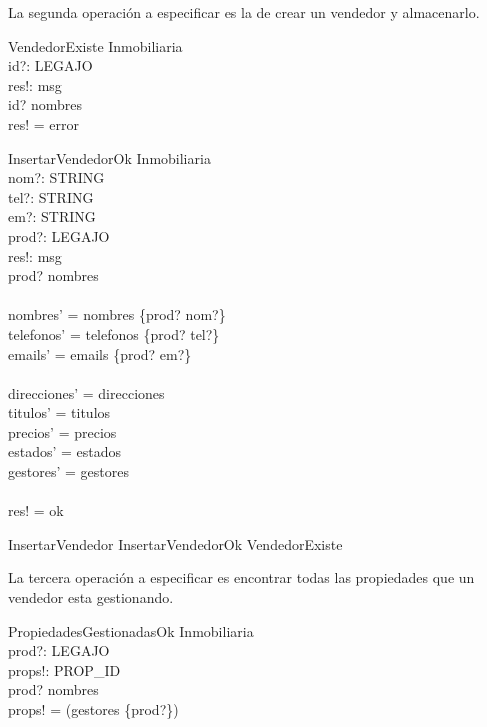 \documentclass[12pt]{article}
\begin{document}
La segunda operación a especificar es la de crear un vendedor y almacenarlo.

\begin{schema}{VendedorExiste}
\Xi Inmobiliaria \\
id?: LEGAJO \\
res!: msg \\
\where
id? \in \dom nombres \\
res! = error \\
\end{schema}

\begin{schema}{InsertarVendedorOk}
\Delta Inmobiliaria \\
nom?: STRING \\
tel?: STRING \\
em?: STRING \\
prod?: LEGAJO \\
res!: msg \\
\where
prod? \nin \dom nombres \\
\ \\
nombres' =  nombres \cup \{prod? \mapsto nom?\}  \\
telefonos' =  telefonos \cup \{prod? \mapsto tel?\}  \\
emails' =  emails \cup \{prod? \mapsto em?\}  \\
\ \\
direcciones' =  direcciones\\
titulos' = titulos\\
precios' = precios\\
estados' = estados\\
gestores' = gestores\\
\ \\
res! = ok \\
\end{schema}

\begin{zed}
InsertarVendedor  InsertarVendedorOk \lor VendedorExiste
\end{zed}

La tercera operación a especificar es encontrar todas las propiedades que un vendedor esta gestionando.

\begin{schema}{PropiedadesGestionadasOk}
\Xi Inmobiliaria \\
prod?: LEGAJO \\
props!: \power PROP\_ID \\
\where
prod? \in \dom nombres \\
props! = \dom(gestores \rres \{prod?\})
\end{schema}
\end{document}
